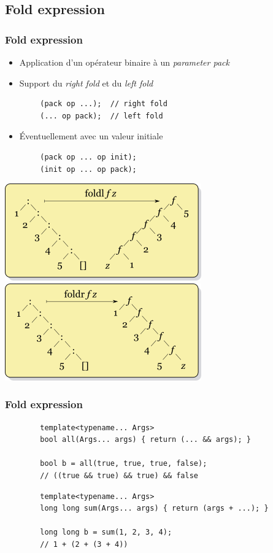 \documentclass[C++.tex]{subfiles}
\begin{document}
\subsection*{Fold expression}
\begin{frame}[fragile]
	\frametitle{Fold expression}
	\begin{itemize}
		\item Application d'un opérateur binaire à un \textit{parameter pack}
		\item Support du \textit{right fold} et du \textit{left fold}
	\end{itemize}

	\begin{verbatim}
		(pack op ...);  // right fold
		(... op pack);  // left fold
	\end{verbatim}

	\begin{itemize}
		\item Éventuellement avec un valeur initiale
	\end{itemize}

	\begin{verbatim}
		(pack op ... op init);
		(init op ... op pack);
	\end{verbatim}

	\begin{center}
		\includegraphics[height=0.30\textheight]{input_src/Left-fold-transformation.png} \includegraphics[height=0.30\textheight]{input_src/Right-fold-transformation.png}
	\end{center}
\end{frame}

\begin{frame}[fragile]
	\frametitle{Fold expression}
	\begin{verbatim}
		template<typename... Args>
		bool all(Args... args) { return (... && args); }

		bool b = all(true, true, true, false);
		// ((true && true) && true) && false
	\end{verbatim}

	\begin{verbatim}
		template<typename... Args>
		long long sum(Args... args) { return (args + ...); }

		long long b = sum(1, 2, 3, 4);
		// 1 + (2 + (3 + 4))
	\end{verbatim}
\end{frame}
\end{document}

